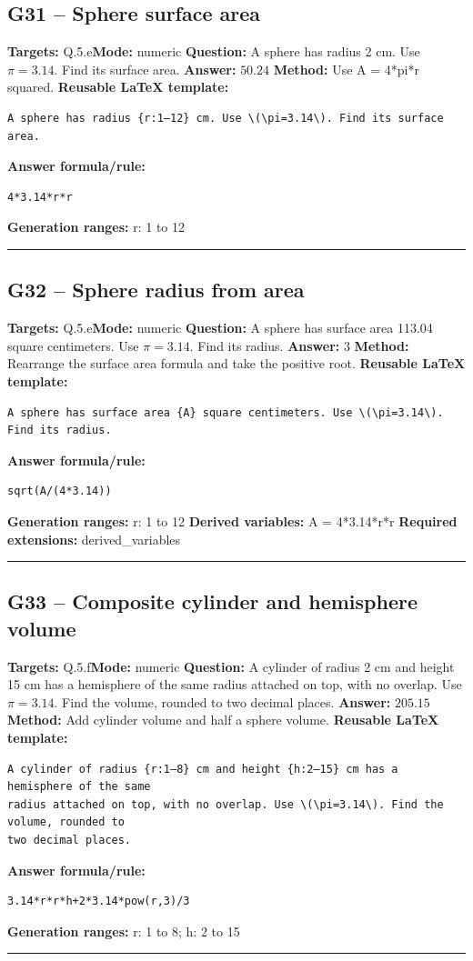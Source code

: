 \documentclass[11pt]{article}
\begin{document}
\subsection{G31 -- Sphere surface area}
\textbf{Targets:} Q.5.e\quad\textbf{Mode:} numeric
\textbf{Question:} A sphere has radius 2 cm. Use \(\pi=3.14\). Find its surface area.
\textbf{Answer:} \(50.24\)
\textbf{Method:} Use A = 4*pi*r squared.
\textbf{Reusable LaTeX template:}
\begin{verbatim}
A sphere has radius {r:1–12} cm. Use \(\pi=3.14\). Find its surface area.
\end{verbatim}
\textbf{Answer formula/rule:}
\begin{verbatim}
4*3.14*r*r
\end{verbatim}
\textbf{Generation ranges:} r: 1 to 12
\medskip\hrule\medskip
\subsection{G32 -- Sphere radius from area}
\textbf{Targets:} Q.5.e\quad\textbf{Mode:} numeric
\textbf{Question:} A sphere has surface area 113.04 square centimeters. Use \(\pi=3.14\). Find its radius.
\textbf{Answer:} \(3\)
\textbf{Method:} Rearrange the surface area formula and take the positive root.
\textbf{Reusable LaTeX template:}
\begin{verbatim}
A sphere has surface area {A} square centimeters. Use \(\pi=3.14\). Find its radius.
\end{verbatim}
\textbf{Answer formula/rule:}
\begin{verbatim}
sqrt(A/(4*3.14))
\end{verbatim}
\textbf{Generation ranges:} r: 1 to 12
\textbf{Derived variables:} A = 4*3.14*r*r
\textbf{Required extensions:} derived\_variables
\medskip\hrule\medskip
\subsection{G33 -- Composite cylinder and hemisphere volume}
\textbf{Targets:} Q.5.f\quad\textbf{Mode:} numeric
\textbf{Question:} A cylinder of radius 2 cm and height 15 cm has a hemisphere of the same radius attached on top, with no overlap. Use \(\pi=3.14\). Find the volume, rounded to two decimal places.
\textbf{Answer:} \(205.15\)
\textbf{Method:} Add cylinder volume and half a sphere volume.
\textbf{Reusable LaTeX template:}
\begin{verbatim}
A cylinder of radius {r:1–8} cm and height {h:2–15} cm has a hemisphere of the same
radius attached on top, with no overlap. Use \(\pi=3.14\). Find the volume, rounded to
two decimal places.
\end{verbatim}
\textbf{Answer formula/rule:}
\begin{verbatim}
3.14*r*r*h+2*3.14*pow(r,3)/3
\end{verbatim}
\textbf{Generation ranges:} r: 1 to 8; h: 2 to 15
\medskip\hrule\medskip
\end{document}
